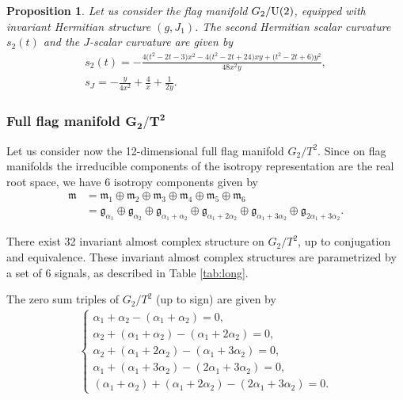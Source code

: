 \documentclass[10pt,a4paper]{amsart}
\numberwithin{equation}{section}
\newtheorem{Proposition}[Theorem]{Proposition}
 { \theoremstyle{definition}
\newtheorem{Definition}[Theorem]{Definition}
\newtheorem{Question}[Theorem]{Question}
\newtheorem*{Notation}{Notation}
\newtheorem{Example}[Theorem]{Example}
\newtheorem{Remark}[Theorem]{Remark} }
\begin{document}
\begin{Proposition}
Let us consider the flag manifold $G_2/{\rm U}(2)$, equipped with invariant Hermitian structure $(g, J_{1})$. The second Hermitian scalar curvature $s_2(t)$ and the $J$-scalar curvature are given by
\begin{gather*}
s_{2}(t)=-\frac{4 \big(t^2-2 t-3\big) x^2-4 \big(t^2-2 t+24\big) x y+\big(t^2-2 t+6\big) y^2}{48 x^2 y},
\\
s_{J}=-\frac{y}{4 x^2}+\frac{4}{x}+\frac{1}{2 y}.
\end{gather*}
\end{Proposition}

\subsubsection[Full flag manifold \protect{$G\textunderscore{}2/T\textasciicircum{}2$}]
{Full flag manifold $\boldsymbol{G_2/T^2}$} \label{g2-full}
Let us consider now the 12-dimensional full flag manifold $G_2/T^2$. Since on flag manifolds the irreducible components of the isotropy representation are the real root space, we have 6 isotropy components given by
\begin{align*}
\mathfrak{m}&=\mathfrak{m_{1}}\oplus\mathfrak{m_{2}}\oplus\mathfrak{m_{3}} \oplus\mathfrak{m_{4}}\oplus\mathfrak{m_{5}}\oplus\mathfrak{m_{6}}
\\
&=\mathfrak{g}_{\alpha_{1}}\oplus\mathfrak{g}_{\alpha_{2}}\oplus\mathfrak{g}_{\alpha_{1} +\alpha_{2}}\oplus\mathfrak{g}_{\alpha_{1}+2\alpha_{2}}\oplus \mathfrak{g}_{\alpha_{1}+3\alpha_{2}}\oplus\mathfrak{g}_{2\alpha_{1}+3\alpha_{2}}.
\end{align*}

There exist 32 invariant almost complex structure on $G_2/T^2$, up to conjugation and equivalence. These invariant almost complex structures are parametrized by a set of 6 signals, as described in Table \ref{tab:long}.



The zero sum triples of $G_2/T^2$ (up to sign) are given by
\begin{gather} \label{tripla-soma-zero-g2}
\begin{cases}
 \alpha_{1}+\alpha_{2}-(\alpha_{1}+\alpha_{2})=0,
 \\
 \alpha_{2}+(\alpha_{1}+\alpha_{2})-(\alpha_{1}+2\alpha_{2})=0,
 \\
 \alpha_{2}+(\alpha_{1}+2\alpha_{2})-(\alpha_{1}+3\alpha_{2})=0,
 \\
 \alpha_{1}+(\alpha_{1}+3\alpha_{2})-(2\alpha_{1}+3\alpha_{2})=0,
 \\
 (\alpha_{1}+\alpha_{2})+(\alpha_{1}+2\alpha_{2})-(2\alpha_{1}+3\alpha_{2})=0.
\end{cases}
\end{gather}
\end{document}
